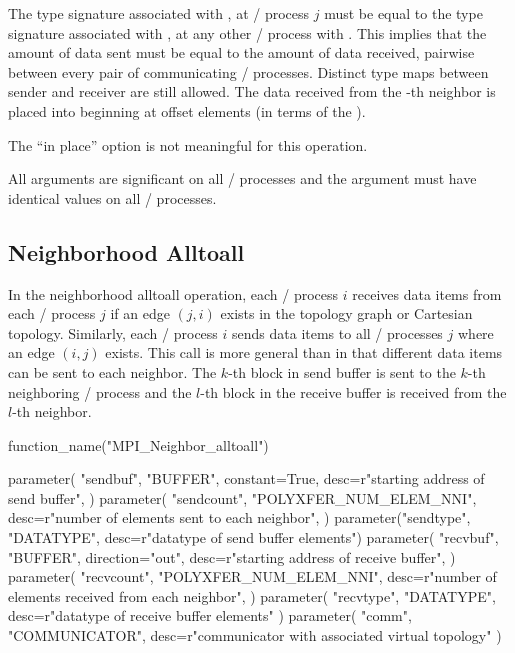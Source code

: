The type signature associated with ,  at
\MPI/ process $j$ must be equal to the type signature associated with
\mpicode{[l]},  at any other \MPI/ process
with .
This implies that the amount of data sent must be equal to the
amount of data received, pairwise between every pair of
communicating \MPI/ processes.
Distinct type maps between sender and receiver are still allowed.
The data received from the -th neighbor is placed into
 beginning at offset \mpicode{[l]}
elements (in terms of the ). 

The ``in place'' option is not meaningful for this operation.

All arguments are significant on all \MPI/ processes and the argument
 must have identical values on all \MPI/ processes.


\subsection{Neighborhood Alltoall}
\label{subsec:sparsecoll:alltoall}

In the neighborhood alltoall operation, each \MPI/ process $i$ receives data items from each \MPI/ process
$j$ if an edge $(j,i)$ exists in the topology graph or Cartesian
topology. Similarly, each \MPI/ process $i$ sends data items to all \MPI/ processes
$j$ where an edge $(i,j)$ exists. This call is more general than
 in that different data items can be
sent to each neighbor. The $k$-th block in send buffer is sent to the
$k$-th neighboring \MPI/ process and the $l$-th block in the receive buffer is
received from the $l$-th neighbor.

\begin{mpi-binding}
    function_name("MPI_Neighbor_alltoall")
    
    parameter(
        "sendbuf",
        "BUFFER",
        constant=True,
        desc=r"starting address of send buffer",
    )
    parameter(
        "sendcount",
        "POLYXFER_NUM_ELEM_NNI",
        desc=r"number of elements sent to each neighbor",
    )
    parameter("sendtype", "DATATYPE", desc=r"datatype of send buffer elements")
    parameter(
        "recvbuf",
        "BUFFER",
        direction="out",
        desc=r"starting address of receive buffer",
    )
    parameter(
        "recvcount",
        "POLYXFER_NUM_ELEM_NNI",
        desc=r"number of elements received from each neighbor",
    )
    parameter(
        "recvtype", "DATATYPE", desc=r"datatype of receive buffer elements"
    )
    parameter(
        "comm", "COMMUNICATOR", desc=r"communicator with associated virtual topology"
    )
\end{mpi-binding}

